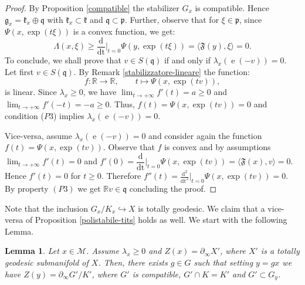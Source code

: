 \documentclass[leqno,11pt, a4]{amsart}
\newtheorem{lemma}[equation]{Lemma}
\theoremstyle{named}
\begin{document}
  \begin{proof}
By Proposition \ref{compatible} the stabilizer $G_x$ is compatible. Hence ${\mathfrak{g}}_x={\mathfrak{k}}_x\oplus {\mathfrak{q}}$ with ${\mathfrak{k}}_x \subset {\mathfrak{k}}$ and ${\mathfrak{q}}\subset {\mathfrak{p}}$.
Further, observe that for $\xi \in {\mathfrak{p}}$, since $\Psi(x, \exp(t\xi))$ is a convex function, we get:
\[
\Lambda(x,\xi)\geq {{\dfrac {\mathrm {d}  }{\mathrm {dt}}} \vert _{t=0} } \Psi(y, \exp( t\xi ) )= {\langle} {\mathfrak{F}}
    (y), \xi {\rangle}=0.
\]
To conclude, we shall prove that $v\in S({\mathfrak{q}})$ if and only if ${\lambda}_x ({\operatorname{e}}(-v))=0$.
Let first ${{v}} \in S({\mathfrak{q}})$. By Remark \ref{stabilizzatore-lineare} the function:
\[
f:{\mathbb{R}} {\longrightarrow} {\mathbb{R}}, \qquad t \mapsto \Psi(x,\exp(tv)),
\]
is linear. Since ${\lambda}_x \geq 0$,  we have $\lim_{t\rightarrow +\infty} f'(t)=a   \geq 0$ and $\lim_{t\rightarrow +\infty} f'(-t)=-a\geq 0$. Thus, $f(t)=\Psi(x,\exp(tv))=0$ and condition ($P3$) implies
${\lambda}_x ({\operatorname{e}} (-v))=0$.

Vice-versa, assume ${\lambda}_x ( {\operatorname{e}} (-v))=0$ and consider again the function $f(t)=\Psi(x,\exp (tv))$. {Observe that }$f$ is convex and by assumptions  $\lim_{t\rightarrow + \infty} f'(t)= 0$ and $f'(0)={{\dfrac {\mathrm {d}  }{\mathrm {dt}}} \vert _{t=0} } \Psi(x,\exp(tv))=\langle {\mathfrak{F}} (x),v \rangle=0$. Hence $f'(t)=0$ for $t\geq 0$. Therefore
$f''(t)=\frac{\mathrm{d^2}}{\mathrm{dt}^2 }\vert_{t=0} \Psi(x,\exp(tv))=0$.  By property $(P3)$ we get ${\mathbb{R}} v \in {\mathfrak{q}}$ concluding the proof.
\end{proof}
Note that the inclusion $G_x/K_x \hookrightarrow X$ is totally geodesic. We claim that a vice-versa  of Proposition \ref{polistabile-tits} holds as well. We start with the following Lemma.
\begin{lemma}\label{lemma-preliminare}
Let $x\in {\mathscr{M}}$. Assume ${\lambda}_x\geq 0$ and $Z(x)=\partial_\infty X'$, where $X'$ is a totally geodesic submanifold of $X$. Then, there exists $g\in G$ such that setting $y=g x$ we have $Z(y)=\partial_\infty G'/K'$, where $G'$ is compatible, $G' \cap K=K'$ and $G'\subset G_y$.
\end{lemma}
\end{document}
